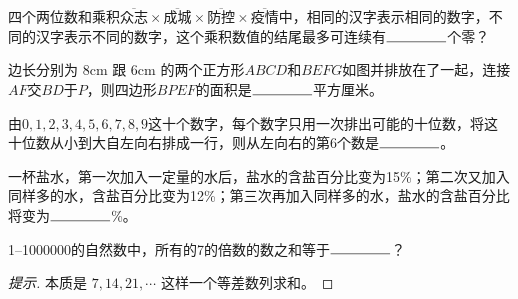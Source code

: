 \begin{question}
  四个两位数和乘积$\overline{\text{众志}}\times\overline{\text{成城}}\times\overline{\text{防控}}\times\overline{\text{疫情}}$中，相同的汉字表示相同的数字，不同的汉字表示不同的数字，这个乘积数值的结尾最多可连续有$\blankline$个零？
\end{question}

\begin{question}
  边长分别为 8cm 跟 6cm 的两个正方形$ABCD$和$BEFG$如图并排放在了一起，连接$AF$交$BD$于$P$，则四边形$BPEF$的面积是$\blankline$平方厘米。

  \begin{center}
  \end{center}
\end{question}


\begin{question}
  由$0,1,2,3,4,5,6,7,8,9$这十个数字，每个数字只用一次排出可能的十位数，将这十位数从小到大自左向右排成一行，则从左向右的第6个数是$\blankline$。
\end{question}


\begin{question}
  一杯盐水，第一次加入一定量的水后，盐水的含盐百分比变为15\%；第二次又加入同样多的水，含盐百分比变为12\%；第三次再加入同样多的水，盐水的含盐百分比将变为$\blankline$\%。
\end{question}


\begin{question}
  1--1000000的自然数中，所有的7的倍数的数之和等于$\blankline$？
\end{question}
\begin{proof}[提示]
  本质是 $7,14,21,\cdots$ 这样一个等差数列求和。
\end{proof}


